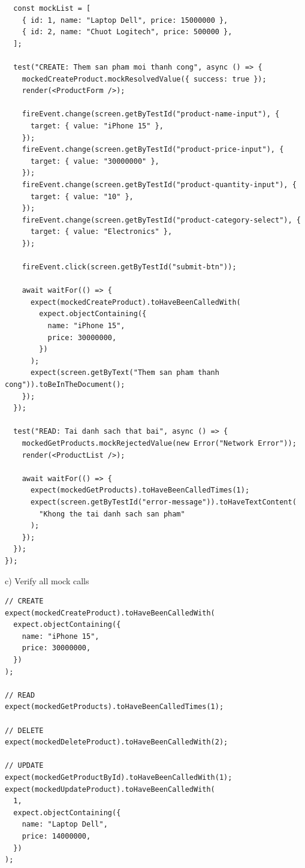 \documentclass[a4paper,12pt]{article}
\begin{document}
{\begin{tcolorbox}[breakable, colback=green!5,colframe=black!50,title=Test Success Và Failure Scenarios ]
\begin{lstlisting}
  const mockList = [
    { id: 1, name: "Laptop Dell", price: 15000000 },
    { id: 2, name: "Chuot Logitech", price: 500000 },
  ];

  test("CREATE: Them san pham moi thanh cong", async () => {
    mockedCreateProduct.mockResolvedValue({ success: true });
    render(<ProductForm />);

    fireEvent.change(screen.getByTestId("product-name-input"), {
      target: { value: "iPhone 15" },
    });
    fireEvent.change(screen.getByTestId("product-price-input"), {
      target: { value: "30000000" },
    });
    fireEvent.change(screen.getByTestId("product-quantity-input"), {
      target: { value: "10" },
    });
    fireEvent.change(screen.getByTestId("product-category-select"), {
      target: { value: "Electronics" },
    });

    fireEvent.click(screen.getByTestId("submit-btn"));

    await waitFor(() => {
      expect(mockedCreateProduct).toHaveBeenCalledWith(
        expect.objectContaining({
          name: "iPhone 15",
          price: 30000000,
        })
      );
      expect(screen.getByText("Them san pham thanh cong")).toBeInTheDocument();
    });
  });

  test("READ: Tai danh sach that bai", async () => {
    mockedGetProducts.mockRejectedValue(new Error("Network Error"));
    render(<ProductList />);

    await waitFor(() => {
      expect(mockedGetProducts).toHaveBeenCalledTimes(1);
      expect(screen.getByTestId("error-message")).toHaveTextContent(
        "Khong the tai danh sach san pham"
      );
    });
  });
});

\end{lstlisting}
\end{tcolorbox}

c) Verify all mock calls
\begin{tcolorbox}[breakable, colback=green!5,colframe=black!50,title= Verify All Mock Calls ]
\begin{lstlisting}
// CREATE
expect(mockedCreateProduct).toHaveBeenCalledWith(
  expect.objectContaining({
    name: "iPhone 15",
    price: 30000000,
  })
);

// READ
expect(mockedGetProducts).toHaveBeenCalledTimes(1);

// DELETE
expect(mockedDeleteProduct).toHaveBeenCalledWith(2);

// UPDATE
expect(mockedGetProductById).toHaveBeenCalledWith(1);
expect(mockedUpdateProduct).toHaveBeenCalledWith(
  1,
  expect.objectContaining({
    name: "Laptop Dell",
    price: 14000000,
  })
);
\end{lstlisting}
\end{tcolorbox}



}
\end{document}
